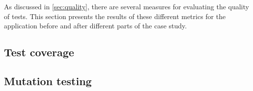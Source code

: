 
As discussed in \ref{sec:quality}, there are several measures for
evaluating the quality of tests. This section presents the results of
these different metrics for the application before and after different
parts of the case study.\\


\subsection{Test coverage}
    

\subsection{Mutation testing}
    
